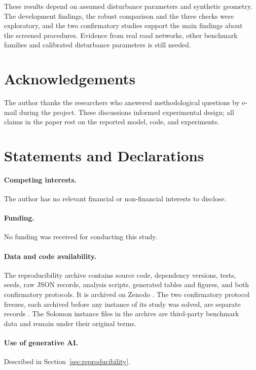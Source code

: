 \documentclass[11pt,a4paper]{article}
\begin{document}
These results depend on assumed disturbance parameters and synthetic geometry.
The development findings, the robust comparison and the three checks were
exploratory, and the two
confirmatory studies support the main findings about the screened procedures. Evidence from real road networks, other benchmark families
and calibrated disturbance parameters is still needed.

\section*{Acknowledgements}
The author thanks the researchers who answered methodological questions by
e-mail during the project.
These discussions informed experimental design; all claims in the paper rest
on the reported model, code, and experiments.

\section*{Statements and Declarations}

\paragraph{Competing interests.} The author has no relevant financial or non-financial interests to disclose.

\paragraph{Funding.} No funding was received for conducting this study.

\paragraph{Data and code availability.} The reproducibility archive contains
source code, dependency versions, tests, seeds, raw JSON records, analysis
scripts, generated tables and figures, and both confirmatory protocols. It is archived on
Zenodo \cite{ali2026archive}.
The two confirmatory protocol freezes, each archived before any instance of its
study was solved, are separate records \cite{ali2026freeze,ali2026freeze2}.
The Solomon instance files in the archive are third-party benchmark data
\cite{solomon1987,ml4vrp2024} and remain under their original terms.

\paragraph{Use of generative AI.} Described in
Section~\ref{sec:reproducibility}.
\end{document}
